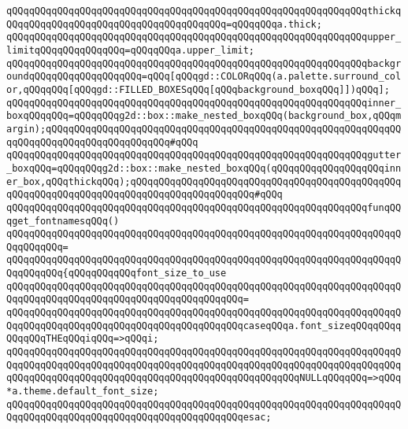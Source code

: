 \verb|qQQqqQQqqQQqqQQqqQQqqQQqqQQqqQQqqQQqqQQqqQQqqQQqqQQqqQQqqQQqqQQqthickqQQqqQQqqQQqqQQqqQQqqQQqqQQqqQQqqQQqqQQq=qQQqqQQqa.thick;|\newline
\verb|qQQqqQQqqQQqqQQqqQQqqQQqqQQqqQQqqQQqqQQqqQQqqQQqqQQqqQQqqQQqqQQqupper_limitqQQqqQQqqQQqqQQq=qQQqqQQqa.upper_limit;|\newline
\newline
\verb|qQQqqQQqqQQqqQQqqQQqqQQqqQQqqQQqqQQqqQQqqQQqqQQqqQQqqQQqqQQqqQQqbackgroundqQQqqQQqqQQqqQQqqQQq=qQQq[qQQqgd::COLORqQQq(a.palette.surround_color,qQQqqQQq[qQQqgd::FILLED_BOXESqQQq[qQQqbackground_boxqQQq]])qQQq];|\newline
\newline
\verb|qQQqqQQqqQQqqQQqqQQqqQQqqQQqqQQqqQQqqQQqqQQqqQQqqQQqqQQqqQQqqQQqinner_boxqQQqqQQq=qQQqqQQqg2d::box::make_nested_boxqQQq(background_box,qQQqmargin);qQQqqQQqqQQqqQQqqQQqqQQqqQQqqQQqqQQqqQQqqQQqqQQqqQQqqQQqqQQqqQQqqQQqqQQqqQQqqQQqqQQqqQQqqQQq#qQQq|\newline
\verb|qQQqqQQqqQQqqQQqqQQqqQQqqQQqqQQqqQQqqQQqqQQqqQQqqQQqqQQqqQQqqQQqgutter_boxqQQq=qQQqqQQqg2d::box::make_nested_boxqQQq(qQQqqQQqqQQqqQQqqQQqinner_box,qQQqthickqQQq);qQQqqQQqqQQqqQQqqQQqqQQqqQQqqQQqqQQqqQQqqQQqqQQqqQQqqQQqqQQqqQQqqQQqqQQqqQQqqQQqqQQqqQQqqQQq#qQQq|\newline
\newline
\verb|qQQqqQQqqQQqqQQqqQQqqQQqqQQqqQQqqQQqqQQqqQQqqQQqqQQqqQQqqQQqqQQqfunqQQqget_fontnamesqQQq()|\newline
\verb|qQQqqQQqqQQqqQQqqQQqqQQqqQQqqQQqqQQqqQQqqQQqqQQqqQQqqQQqqQQqqQQqqQQqqQQqqQQqqQQq=|\newline
\verb|qQQqqQQqqQQqqQQqqQQqqQQqqQQqqQQqqQQqqQQqqQQqqQQqqQQqqQQqqQQqqQQqqQQqqQQqqQQqqQQq{qQQqqQQqqQQqfont_size_to_use|\newline
\verb|qQQqqQQqqQQqqQQqqQQqqQQqqQQqqQQqqQQqqQQqqQQqqQQqqQQqqQQqqQQqqQQqqQQqqQQqqQQqqQQqqQQqqQQqqQQqqQQqqQQqqQQqqQQqqQQq=|\newline
\verb|qQQqqQQqqQQqqQQqqQQqqQQqqQQqqQQqqQQqqQQqqQQqqQQqqQQqqQQqqQQqqQQqqQQqqQQqqQQqqQQqqQQqqQQqqQQqqQQqqQQqqQQqqQQqqQQqcaseqQQqa.font_sizeqQQqqQQqqQQqqQQqTHEqQQqiqQQq=>qQQqi;|\newline
\verb|qQQqqQQqqQQqqQQqqQQqqQQqqQQqqQQqqQQqqQQqqQQqqQQqqQQqqQQqqQQqqQQqqQQqqQQqqQQqqQQqqQQqqQQqqQQqqQQqqQQqqQQqqQQqqQQqqQQqqQQqqQQqqQQqqQQqqQQqqQQqqQQqqQQqqQQqqQQqqQQqqQQqqQQqqQQqqQQqqQQqqQQqqQQqqQQqNULLqQQqqQQq=>qQQq*a.theme.default_font_size;|\newline
\verb|qQQqqQQqqQQqqQQqqQQqqQQqqQQqqQQqqQQqqQQqqQQqqQQqqQQqqQQqqQQqqQQqqQQqqQQqqQQqqQQqqQQqqQQqqQQqqQQqqQQqqQQqqQQqqQQqesac;|\newline
